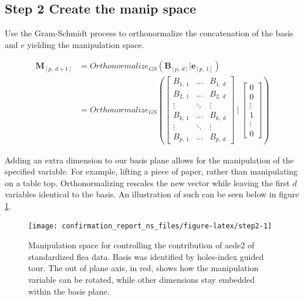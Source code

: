 \documentclass{monashthesis}
\begin{document}
\subsection{Step 2 Create the manip
space}\label{step-2-create-the-manip-space-1}

Use the Gram-Schmidt process to orthonormalize the concatenation of the
basis and \(e\) yielding the manipulation space.

\begin{align*}
  \textbf{M}_{[p,~d+1]}
  &= Orthonormalize_{GS}( \textbf{B}_{[p,~d]}|\textbf{e}_{[p,~1]} ) \\
  &= Orthonormalize_{GS}
  \left(
    \begin{bmatrix}
      B_{1,~1} & \dots  & B_{1,~d} \\
      B_{2,~1} & \dots  & B_{2,~d} \\
      \vdots   & \ddots & \vdots   \\
      B_{k,~1} & \dots  & B_{k,~d} \\
      \vdots   & \ddots & \vdots   \\
      B_{p,~1} & \dots  & B_{p,~d}
    \end{bmatrix}
  ~|~
    \begin{bmatrix}
      0 \\
      0 \\
      \vdots \\
      1 \\
      \vdots \\
      0
    \end{bmatrix}
  \right)
\end{align*}

Adding an extra dimension to our basis plane allows for the manipulation
of the specified variable. For example, lifting a piece of paper, rather
than manipulating on a table top. Orthonormalizing rescales the new
vector while leaving the first \(d\) variables identical to the basis.
An illustration of such can be seen below in figure \ref{fig:step2}.

\begin{figure}

{\centering \texttt{[image: confirmation\_report\_ns\_files/figure-latex/step2-1]} 

}

\caption{Manipulation space for controlling the contribution of aede2 of standardized flea data. Basis was identified by holes-index guided tour. The out of plane axis, in red, shows how the manipulation variable can be rotated, while other dimensions stay embedded within the basis plane.}\label{fig:step2}
\end{figure}
\end{document}
